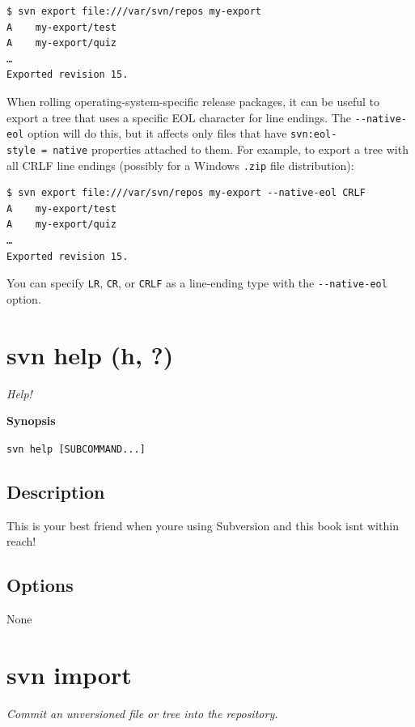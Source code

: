 \begin{verbatim}
$ svn export file:///var/svn/repos my-export
A    my-export/test
A    my-export/quiz
…
Exported revision 15.
\end{verbatim}

When rolling operating-system-specific release packages, it can be
useful to export a tree that uses a specific EOL character for line
endings. The \texttt{-\/-native-eol} option will do this, but it affects
only files that have \texttt{svn:eol-style\ =\ native} properties
attached to them. For example, to export a tree with all CRLF line
endings (possibly for a Windows \texttt{.zip} file distribution):

\begin{verbatim}
$ svn export file:///var/svn/repos my-export --native-eol CRLF
A    my-export/test
A    my-export/quiz
…
Exported revision 15.
\end{verbatim}

You can specify \texttt{LR}, \texttt{CR}, or \texttt{CRLF} as a
line-ending type with the \texttt{-\/-native-eol} option.

\section{svn help (h, ?)}\label{svn.ref.svn.c.help}

\emph{Help!}

\textbf{Synopsis}

\texttt{svn\ help\ {[}SUBCOMMAND...{]}}

\subsection{Description}

This is your best friend when you\textquotesingle re using Subversion
and this book isn\textquotesingle t within reach!

\subsection{Options}

None

\section{svn import}\label{svn.ref.svn.c.import}

\emph{Commit an unversioned file or tree into the repository.}

